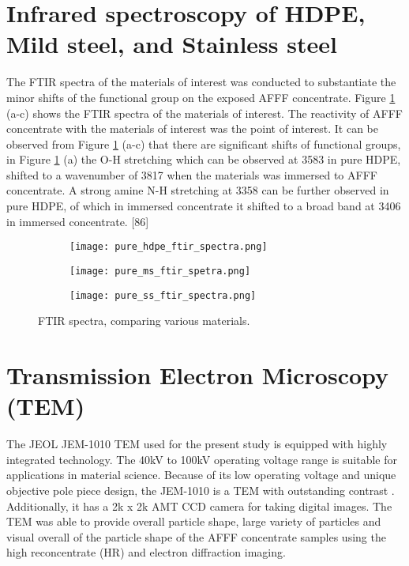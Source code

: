 \section{Infrared spectroscopy of HDPE, Mild steel, and Stainless steel}  
The FTIR spectra of the materials of interest was conducted to substantiate the minor shifts of the functional group on the exposed AFFF concentrate. Figure \ref{ch5:figure:materials} (a-c) shows the FTIR spectra of the materials of interest. The reactivity of AFFF concentrate with the materials of interest was the point of interest. It can be observed from Figure \ref{ch5:figure:materials} (a-c) that there are significant shifts of functional groups, in Figure \ref{ch5:figure:materials} (a) the O-H stretching which can be observed at 3583 in pure HDPE, shifted to a wavenumber of 3817 when the materials was immersed to AFFF concentrate. A strong amine N-H stretching at 3358 can be further observed in pure HDPE, of which in immersed concentrate it shifted to a broad band at 3406 in immersed concentrate. [86]

\begin{figure}[H]
\centering

\begin{subfigure}{.45\textwidth}
    \texttt{[image: pure\_hdpe\_ftir\_spectra.png]}
    \caption{}
\end{subfigure}
\begin{subfigure}{.45\textwidth}
    \texttt{[image: pure\_ms\_ftir\_spetra.png]}
    \caption{}
\end{subfigure}
\begin{subfigure}{.45\textwidth}
    \texttt{[image: pure\_ss\_ftir\_spectra.png]}
    \caption{}
\end{subfigure}

\caption{FTIR spectra, comparing various materials.}
\label{ch5:figure:materials}
\end{figure}

\section{Transmission Electron Microscopy (TEM)}
The JEOL JEM-1010 TEM used for the present study is equipped with highly integrated technology. The 40kV to 100kV operating voltage range is suitable for applications in material science. Because of its low operating voltage and unique objective pole piece design, the JEM-1010 is a TEM with outstanding contrast \cite{krimm1986vibrational}. Additionally, it has a 2k x 2k AMT CCD camera for taking digital images. The TEM was able to provide overall particle shape, large variety of particles and visual overall of the particle shape of the AFFF concentrate samples using the high reconcentrate (HR) and electron diffraction imaging.  

